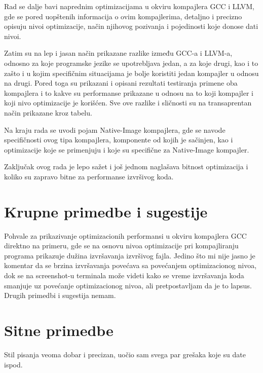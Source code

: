 \documentclass[a4paper]{report}
\begin{document}
Rad se dalje bavi naprednim optimizacijama u okviru kompajlera GCC i LLVM, gde se pored uopštenih informacija o ovim kompajlerima, detaljno i precizno opisuju nivoi optimizacije, način njihovog pozivanja i pojedinosti koje donose dati nivoi. 

Zatim su na lep i jasan način prikazane razlike između GCC-a i LLVM-a, odnosno za koje programske jezike se upotrebljava jedan, a za koje drugi, kao i to zašto i u kojim specifičnim situacijama je bolje koristiti jedan kompajler u odnosu na drugi. Pored toga su prikazani i opisani rezultati testiranja primene oba kompajlera i to kakve su performanse prikazane u odnosu na to koji kompajler i koji nivo optimizacije je korišćen.
Sve ove razlike i sličnosti su na transaprentan način prikazane kroz tabelu.

Na kraju rada se uvodi pojam Native-Image kompajlera, gde se navode specifičnosti ovog tipa kompajlera, komponente od kojih je sačinjen, kao i optimizacije koje se primenjuju i koje su specifične za Native-Image kompajler.

Zaključak ovog rada je lepo sažet i još jednom naglašava bitnost optimizacija i koliko su zapravo bitne za performanse izvršivog koda.


\section{Krupne primedbe i sugestije}
Pohvale za prikazivanje optimizacionih performansi u okviru kompajlera GCC direktno na primeru, gde se na osnovu nivoa optimizacije pri kompajliranju programa prikazuje dužina izvršavanja izvršivog fajla. Jedino što mi nije jasno je komentar da se brzina izvršavanja povećava sa povećanjem optimizacionog nivoa, dok se na screenshot-u terminala može videti kako se vreme izvršavanja koda smanjuje uz povećanje optimizacionog nivoa, ali pretpostavljam da je to lapsus. Drugih primedbi i sugestija nemam.

\section{Sitne primedbe}
Stil pisanja veoma dobar i precizan, uočio sam svega par grešaka koje su date ispod.
\end{document}
